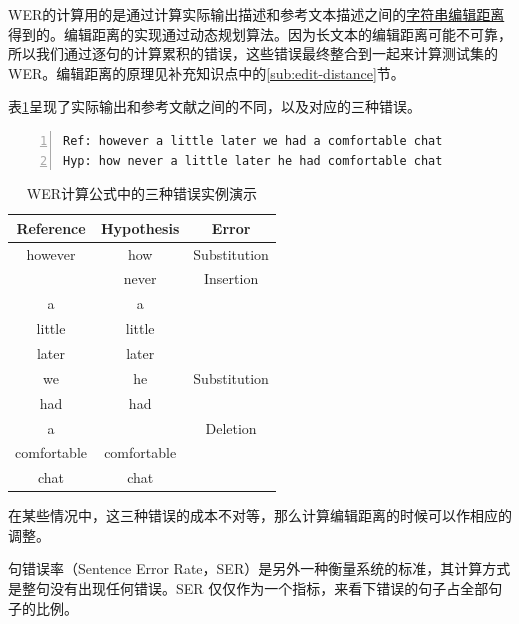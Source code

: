 WER的计算用的是通过计算实际输出描述和参考文本描述之间的\href{https://en.wikipedia.org/wiki/Edit_distance}{字符串编辑距离}得到的。编辑距离的实现通过动态规划算法。因为长文本的编辑距离可能不可靠，所以我们通过逐句的计算累积的错误，这些错误最终整合到一起来计算测试集的WER。编辑距离的原理见补充知识点中的\ref{sub:edit-distance}节。

表\ref{tab:wer}呈现了实际输出和参考文献之间的不同，以及对应的三种错误。
\begin{lstlisting}[language = python, numbers=left, 
				 numberstyle=\tiny,keywordstyle=\color{blue!70},
				 commentstyle=\color{red!50!green!50!blue!50},frame=shadowbox,
				 rulesepcolor=\color{red!20!green!20!blue!20},basicstyle=\ttfamily]
Ref: however a little later we had a comfortable chat
Hyp: how never a little later he had comfortable chat
\end{lstlisting}
\begin{table}[h]
 \centering
 \caption{WER计算公式中的三种错误实例演示}
	 \begin{tabular*}{1\textwidth}{@{\extracolsep{\fill}}ccc}
	 \toprule
		{\bf Reference} & {\bf Hypothesis} & {\bf Error} \\
	 \midrule
	 however      &        how  & Substitution \\ \hline
								&      never  &  Insertion   \\ \hline
				 a      &          a  &              \\ \hline
		little      &     little  &              \\ \hline
		later       &      later  &              \\ \hline
		we          &         he  & Substitution  \\ \hline
		had         &        had  &              \\ \hline
		a           &             &   Deletion   \\ \hline
	comfortable   & comfortable &              \\ \hline
			chat      &       chat  &              \\
	 \bottomrule
	 \end{tabular*}%
 \label{tab:wer}%
\end{table}%

在某些情况中，这三种错误的成本不对等，那么计算编辑距离的时候可以作相应的调整。

句错误率（Sentence Error Rate，SER）是另外一种衡量系统的标准，其计算方式是整句没有出现任何错误。SER 仅仅作为一个指标，来看下错误的句子占全部句子的比例。

